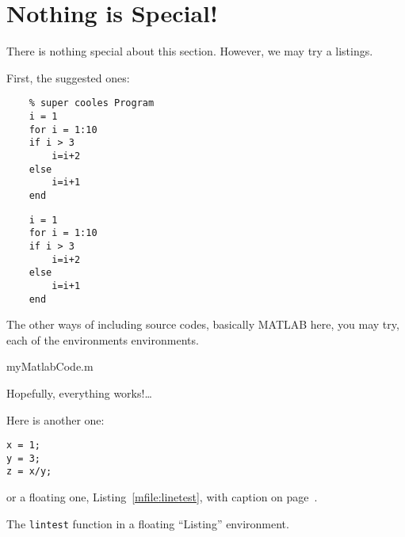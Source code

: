 \section{Nothing is Special!}
\label{sec:nothing-special}

There is nothing special about this section.
However, we may try a listings.

First, the suggested ones:
\begin{Verbatim}
    % super cooles Program
    i = 1
    for i = 1:10
    if i > 3
        i=i+2
    else
        i=i+1
    end
\end{Verbatim}

\begin{Verbatim}[frame=none, numbers=none]
    % super cooles Program
    i = 1
    for i = 1:10
    if i > 3
        i=i+2
    else
        i=i+1
    end
\end{Verbatim}

The other ways of including source codes, basically MATLAB here, you may try, each of the environments environments.

\VerbatimInput%
	{myMatlabCode.m}

Hopefully, everything works!\ldots

Here is another one:

\begin{Verbatim}
x = 1;
y = 3;
z = x/y;
\end{Verbatim}

or a floating one, Listing~\ref{mfile:linetest}, 
with caption on page~\pageref{mfile:linetest}.
\begin{listing}
\caption{The \texttt{lintest} function in a floating ``Listing'' environment.}
\label{mfile:linetest}
\end{listing}

